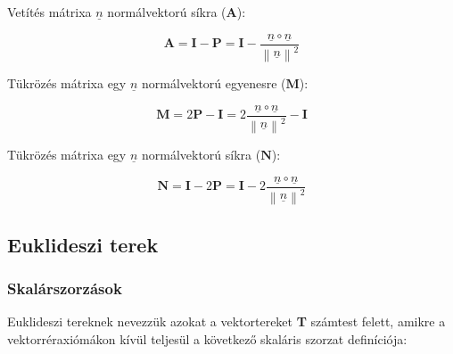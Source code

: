 \documentclass{article}
\begin{document}
Vetítés mátrixa $\underline{n}$ normálvektorú síkra ($\mathbf{A}$):

\begin{equation*}
    \mathbf{A} = \mathbf{I} - \mathbf{P} = \mathbf{I} - \frac{\underline{n} \circ \underline{n}}{\left\lVert \underline{n} \right\rVert^2} 
\end{equation*}

Tükrözés mátrixa egy $\underline{n}$ normálvektorú egyenesre ($\mathbf{M}$):

\begin{equation*}
    \mathbf{M} = 2\mathbf{P} - \mathbf{I} = 2\frac{\underline{n} \circ \underline{n}}{\left\lVert \underline{n} \right\rVert^2} - \mathbf{I}
\end{equation*}

Tükrözés mátrixa egy $\underline{n}$ normálvektorú síkra ($\mathbf{N}$):

\begin{equation*}
    \mathbf{N} = \mathbf{I} - 2\mathbf{P} = \mathbf{I} - 2\frac{\underline{n} \circ \underline{n}}{\left\lVert \underline{n} \right\rVert^2}
\end{equation*}

\newpage

\subsection{Euklideszi terek}

\subsubsection{Skalárszorzások}

Euklideszi tereknek nevezzük azokat a vektortereket \textbf{T} számtest felett, amikre a vektorréraxiómákon kívül teljesül a következő skaláris szorzat definíciója:
\end{document}
